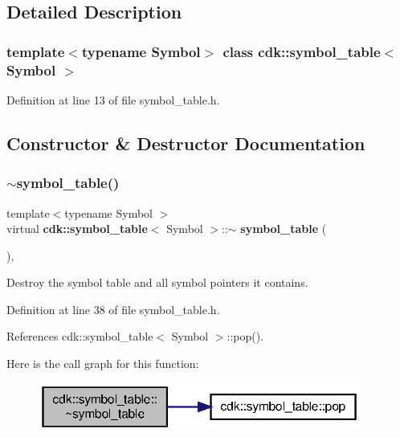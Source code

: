 \subsection{Detailed Description}
\subsubsection*{template$<$typename Symbol$>$\newline
class cdk\+::symbol\+\_\+table$<$ Symbol $>$}



Definition at line 13 of file symbol\+\_\+table.\+h.



\subsection{Constructor \& Destructor Documentation}
\mbox{\label{classcdk_1_1symbol__table_af25f5665467f9bb061b83ca997fd13e6}} 
\subsubsection{$\sim$symbol\+\_\+table()}
{\footnotesize\ttfamily template$<$typename Symbol $>$ \\
virtual \textbf{ cdk\+::symbol\+\_\+table}$<$ Symbol $>$\+::$\sim$\textbf{ symbol\+\_\+table} (\begin{DoxyParamCaption}{ }\end{DoxyParamCaption})\hspace{0.3cm}{\ttfamily [inline]}, {\ttfamily [virtual]}}

Destroy the symbol table and all symbol pointers it contains. 

Definition at line 38 of file symbol\+\_\+table.\+h.



References cdk\+::symbol\+\_\+table$<$ Symbol $>$\+::pop().

Here is the call graph for this function\+:
\nopagebreak
\begin{figure}[H]
\begin{center}
\leavevmode
\includegraphics[width=300pt]{classcdk_1_1symbol__table_af25f5665467f9bb061b83ca997fd13e6_cgraph}
\end{center}
\end{figure}


